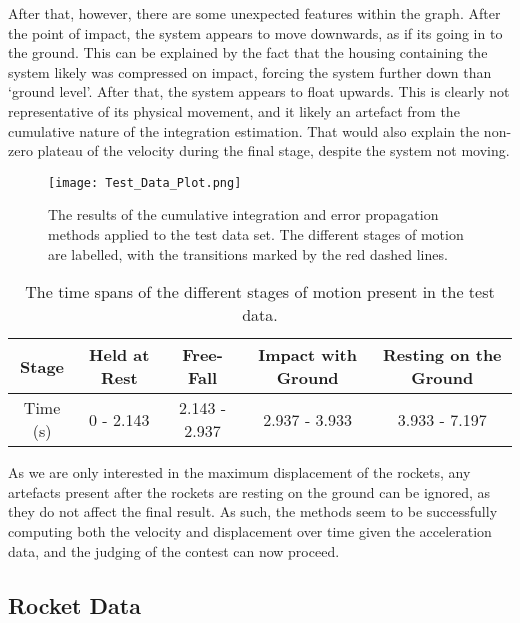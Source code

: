 \documentclass{article}
\begin{document}
        After that, however, there are some unexpected features within the graph. After the point of impact, the system appears to move downwards, as if its going in to the ground. This can be explained by the fact that the housing containing the system likely was compressed on impact, forcing the system further down than `ground level'. After that, the system appears to float upwards. This is clearly not representative of its physical movement, and it likely an artefact from the cumulative nature of the integration estimation. That would also explain the non-zero plateau of the velocity during the final stage, despite the system not moving. 

        \begin{figure}[H]
            \centering
            \texttt{[image: Test\_Data\_Plot.png]}
            \caption{The results of the cumulative integration and error propagation methods applied to the test data set. The different stages of motion are labelled, with the transitions marked by the red dashed lines.}
            \label{fig:test_data}
        \end{figure}

        \begin{table}[H]
            \centering
            \begin{tabular}{|c|c|c|c|c|}
            \hline
                Stage & Held at Rest & Free-Fall & Impact with Ground & Resting on the Ground \\
                \hline
                 Time (s) & 0 - 2.143 & 2.143 - 2.937 & 2.937 - 3.933 & 3.933 - 7.197 \\
                 \hline
            \end{tabular}
            \caption{The time spans of the different stages of motion present in the test data.}
            \label{tab:test_data_transitions}
        \end{table}

        As we are only interested in the maximum displacement of the rockets, any artefacts present after the rockets are resting on the ground can be ignored, as they do not affect the final result. As such, the methods seem to be successfully computing both the velocity and displacement over time given the acceleration data, and the judging of the contest can now proceed.

    \subsection*{Rocket Data}
\end{document}
